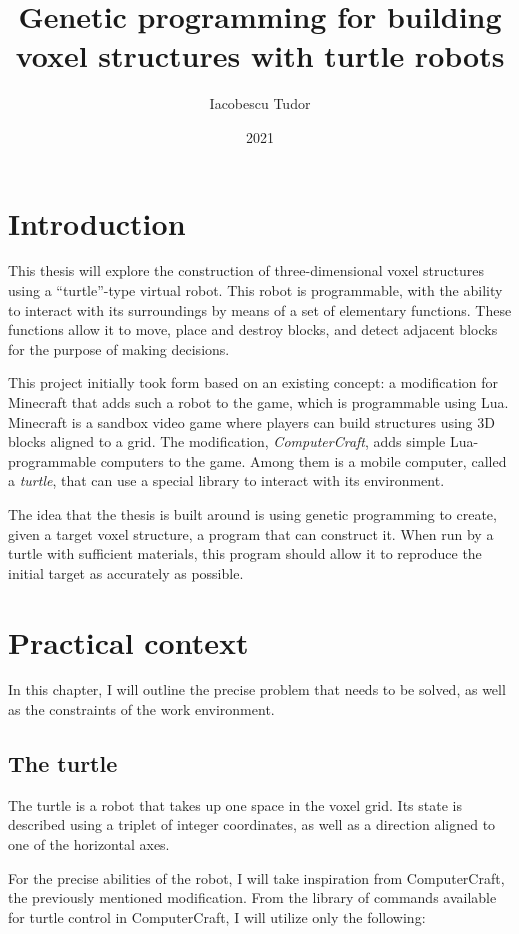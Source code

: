 \documentclass{report}
\title{Genetic programming for building voxel structures with turtle robots}
\author{Iacobescu Tudor}
\date{2021}
\begin{document}
\maketitle

\tableofcontents

\chapter{Introduction}
This thesis will explore the construction of three-dimensional voxel structures using a “turtle”-type virtual robot. This robot is programmable, with the ability to interact with its surroundings by means of a set of elementary functions. These functions allow it to move, place and destroy blocks, and detect adjacent blocks for the purpose of making decisions.

This project initially took form based on an existing concept: a modification for Minecraft that adds such a robot to the game, which is programmable using Lua. Minecraft is a sandbox video game where players can build structures using 3D blocks aligned to a grid. The modification, \emph{ComputerCraft}\cite{ccwiki}, adds simple Lua-programmable computers to the game. Among them is a mobile computer, called a \emph{turtle}, that can use a special library to interact with its environment.

The idea that the thesis is built around is using genetic programming to create, given a target voxel structure, a program that can construct it. When run by a turtle with sufficient materials, this program should allow it to reproduce the initial target as accurately as possible.

\chapter{Practical context}
In this chapter, I will outline the precise problem that needs to be solved, as well as the constraints of the work environment.

\section{The turtle}
\label{sec:turtle}

The turtle is a robot that takes up one space in the voxel grid. Its state is described using a triplet of integer coordinates, as well as a direction aligned to one of the horizontal axes.

For the precise abilities of the robot, I will take inspiration from ComputerCraft, the previously mentioned modification. From the library of commands available for turtle control in ComputerCraft, I will utilize only the following:
\end{document}
